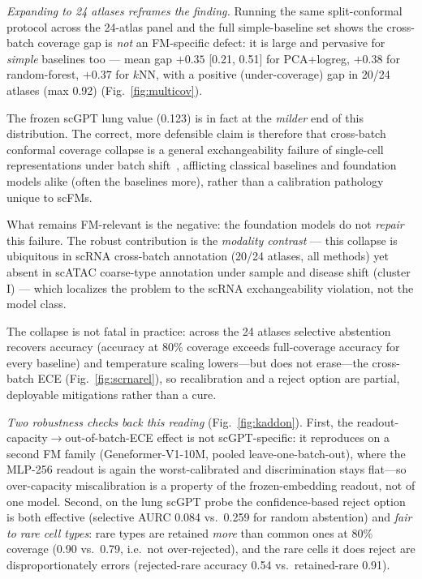 \documentclass[fleqn,10pt,lineno]{wlpeerj}  %
\begin{document}
\emph{Expanding to 24 atlases reframes the finding.} Running the same split-conformal protocol across the 24-atlas panel and the full simple-baseline set shows the cross-batch coverage gap is \emph{not} an FM-specific defect: it is large and pervasive for \emph{simple} baselines too --- mean gap $+0.35$ [0.21, 0.51] for PCA+logreg, $+0.38$ for random-forest, $+0.37$ for $k$NN, with a positive (under-coverage) gap in 20/24 atlases (max 0.92) (Fig.~\ref{fig:multicov}).

The frozen scGPT lung value (0.123) is in fact at the \emph{milder} end of this distribution. The correct, more defensible claim is therefore that cross-batch conformal coverage collapse is a general exchangeability failure of single-cell representations under batch shift~\cite{barber2023}, afflicting classical baselines and foundation models alike (often the baselines more), rather than a calibration pathology unique to scFMs.

What remains FM-relevant is the negative: the foundation models do not \emph{repair} this failure. The robust contribution is the \emph{modality contrast} --- this collapse is ubiquitous in scRNA cross-batch annotation (20/24 atlases, all methods) yet absent in scATAC coarse-type annotation under sample and disease shift (cluster I) --- which localizes the problem to the scRNA exchangeability violation, not the model class.

The collapse is not fatal in practice: across the 24 atlases selective abstention recovers accuracy (accuracy at 80\% coverage exceeds full-coverage accuracy for every baseline) and temperature scaling lowers---but does not erase---the cross-batch ECE (Fig.~\ref{fig:scrnarel}), so recalibration and a reject option are partial, deployable mitigations rather than a cure.

\emph{Two robustness checks back this reading} (Fig.~\ref{fig:kaddon}). First, the readout-capacity$\to$out-of-batch-ECE effect is not scGPT-specific: it reproduces on a second FM family (Geneformer-V1-10M, pooled leave-one-batch-out), where the MLP-256 readout is again the worst-calibrated and discrimination stays flat---so over-capacity miscalibration is a property of the frozen-embedding readout, not of one model. Second, on the lung scGPT probe the confidence-based reject option is both effective (selective AURC 0.084 vs.\ 0.259 for random abstention) and \emph{fair to rare cell types}: rare types are retained \emph{more} than common ones at 80\% coverage (0.90 vs.\ 0.79, i.e.\ not over-rejected), and the rare cells it does reject are disproportionately errors (rejected-rare accuracy 0.54 vs.\ retained-rare 0.91).
\end{document}
